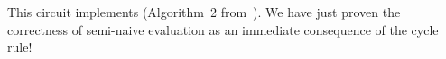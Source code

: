 This circuit implements 
(Algorithm~2 from~\cite{greco-sldm15}).  We have just proven the
correctness of semi-naive evaluation as an immediate consequence
of the cycle rule!


\vspace{-3ex}

